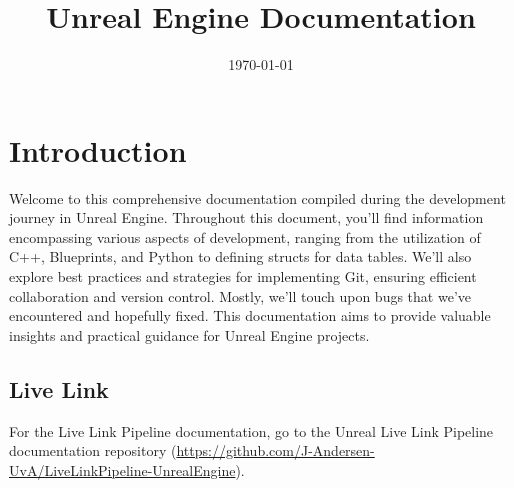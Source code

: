 \documentclass{uva-inf-article}
\title{Unreal Engine Documentation}
\date{\today}
\begin{document}
\maketitle


\tableofcontents
\newpage
\section{Introduction}
Welcome to this comprehensive documentation compiled during the development journey in Unreal Engine. Throughout this document, you'll find information encompassing various aspects of development, ranging from the utilization of C++, Blueprints, and Python to defining structs for data tables. We'll also explore best practices and strategies for implementing Git, ensuring efficient collaboration and version control. Mostly, we'll touch upon bugs that we've encountered and hopefully fixed. This documentation aims to provide valuable insights and practical guidance for Unreal Engine projects.

\subsection{Live Link}
For the Live Link Pipeline documentation, go to the Unreal Live Link Pipeline documentation repository (\url{https://github.com/J-Andersen-UvA/LiveLinkPipeline-UnrealEngine}).

\end{document}
